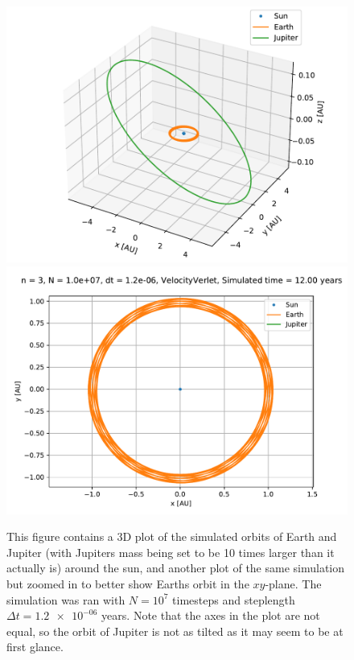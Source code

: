 \documentclass[reprint,english,notitlepage]{revtex4-1}  %
\begin{document}
\begin{figure}[H]
\includegraphics[scale=0.5]{../data/figures/sun-earth-jupiter/sej_10xM_vv_orbit3D.pdf}
\includegraphics[scale=0.5]{../data/figures/sun-earth-jupiter/sej_10xM_vv_orbit2D_zoomed.pdf}
\caption{This figure contains a 3D plot of the simulated orbits of Earth and Jupiter (with Jupiters mass being set to be 10 times larger than it actually is) around the sun, and another plot of the same simulation but zoomed in to better show Earths orbit in the $xy$-plane. The simulation was ran with $N=10^7$ timesteps and steplength $\Delta t = \num{1.2e-06}$ years. Note that the axes in the plot are not equal, so the orbit of Jupiter is not as tilted as it may seem to be at first glance.}
\label{fig:sej-10}
\end{figure}
\end{document}
